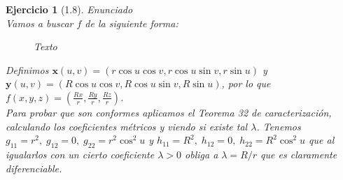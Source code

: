 \documentclass[a4paper,10pt]{article}
\newtheorem{ejercicio}{Ejercicio}[section]
\begin{document}
\begin{ejercicio}[1.8]
Enunciado\\

Vamos a buscar $f$ de la siguiente forma:

\begin{figure}[h]
	\centering
	\caption{Texto}
	\label{fig:texto}
\end{figure}

Definimos $\mathbf{x}(u,v)=(r\cos u\cos v,r\cos u\sin v,r\sin u)$ y $\mathbf{y}(u,v)=(R\cos u\cos v,R\cos u\sin v,R\sin u)$, por lo que $f(x,y,z)=(\frac{Rx}{r},\frac{Ry}{r},\frac{Rz}{r})$.\\
Para probar que son conformes aplicamos el Teorema 32 de caracterización, calculando los coeficientes métricos y viendo si existe tal $\lambda$. Tenemos $g_{11}=r^2,\;g_{12}=0,\;g_{22}=r^2\cos^2 u$ y $h_{11}=R^2,\;h_{12}=0,\;h_{22}=R^2\cos^2 u$ que al igualarlos con un cierto coeficiente $\lambda>0$ obliga a $\lambda=R/r$ que es claramente diferenciable. 
\end{ejercicio}
\end{document}
